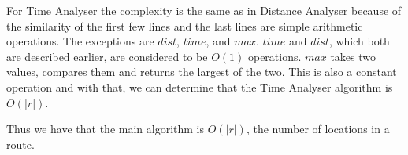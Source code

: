 For Time Analyser the complexity is the same as in Distance Analyser because of the similarity of the first few lines and the last lines are simple arithmetic operations. 
The exceptions are $dist$, $time$, and $max$. 
$time$ and $dist$, which both are described earlier, are considered to be $O(1)$ operations.
$max$ takes two values, compares them and returns the largest of the two.
This is also a constant operation and with that, we can determine that the Time Analyser algorithm is $O(|r|)$.

Thus we have that the main algorithm is $O(|r|)$, the number of locations in a route.